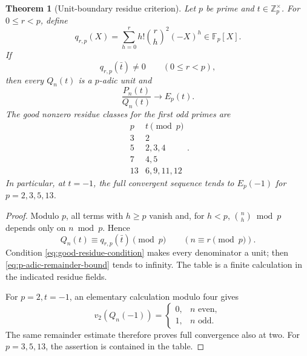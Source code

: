 \documentclass[11pt]{article}
\newtheorem{theorem}{Theorem}[section]
\theoremstyle{definition}
\theoremstyle{remark}
\newcommand{\Z}{\mathbb Z}
\begin{document}
\begin{theorem}[Unit-boundary residue criterion]
\label{thm:p-adic-unit-criterion}
Let \(p\) be prime and \(t\in\Z_p^\times\).  For
\(0\le r<p\), define
\begin{equation}\label{eq:q-rp}
 q_{r,p}(X)=\sum_{h=0}^rh!\binom rh^2(-X)^h\in\mathbb F_p[X].
\end{equation}
If
\begin{equation}\label{eq:good-residue-condition}
 q_{r,p}(\bar t)\ne0\qquad(0\le r<p),
\end{equation}
then every \(Q_n(t)\) is a \(p\)-adic unit and
\begin{equation}\label{eq:full-p-adic-convergence}
 \boxed{\displaystyle
 \frac{P_n(t)}{Q_n(t)}\longrightarrow E_p(t).}
\end{equation}
The good nonzero residue classes for the first odd primes are
\begin{equation}\label{eq:good-residue-table}
 \begin{array}{c|c}
 p&t\pmod p\\ \hline
 3&2\\
 5&2,3,4\\
 7&4,5\\
 13&6,9,11,12
 \end{array}.
\end{equation}
In particular, at \(t=-1\), the full convergent sequence tends to
\(E_p(-1)\) for \(p=2,3,5,13\).
\end{theorem}

\begin{proof}
Modulo \(p\), all terms with \(h\ge p\) vanish and, for \(h<p\),
\(\binom nh\bmod p\) depends only on \(n\bmod p\).  Hence
\begin{equation}\label{eq:Q-period-p}
 Q_n(t)\equiv q_{r,p}(\bar t)\pmod p
 \qquad(n\equiv r\pmod p).
\end{equation}
Condition \eqref{eq:good-residue-condition} makes every denominator a unit;
then \eqref{eq:p-adic-remainder-bound} tends to infinity.  The table is a
finite calculation in the indicated residue fields.

For \(p=2,t=-1\), an elementary calculation modulo four gives
\begin{equation}\label{eq:Q-v2}
 v_2(Q_n(-1))=
 \begin{cases}0,&n\text{ even},\\1,&n\text{ odd}.
 \end{cases}
\end{equation}
The same remainder estimate therefore proves full convergence also at two.
For \(p=3,5,13\), the assertion is contained in the table.
\end{proof}
\end{document}
